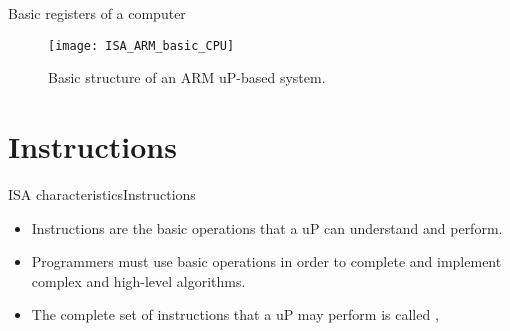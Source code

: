 \begin{frame}{Basic registers of a computer}{}
\vspace{-5pt}
\begin{figure}
\texttt{[image: ISA\_ARM\_basic\_CPU]}
\vspace{-5pt}
\caption{Basic structure of an ARM \ac{uP}-based system.}
\label{Figure:basic_registers}
\end{figure}
\end{frame}

\section{Instructions}
\begin{frame}{\acs{ISA} characteristics}{Instructions}
\begin{itemize}
\item Instructions are the basic operations that a \ac{uP} can understand and perform.
\item Programmers must use basic operations in order to complete and implement complex and high-level algorithms.
\item The complete set of instructions that a \ac{uP} may perform is called , 
\end{itemize}
\end{frame}

